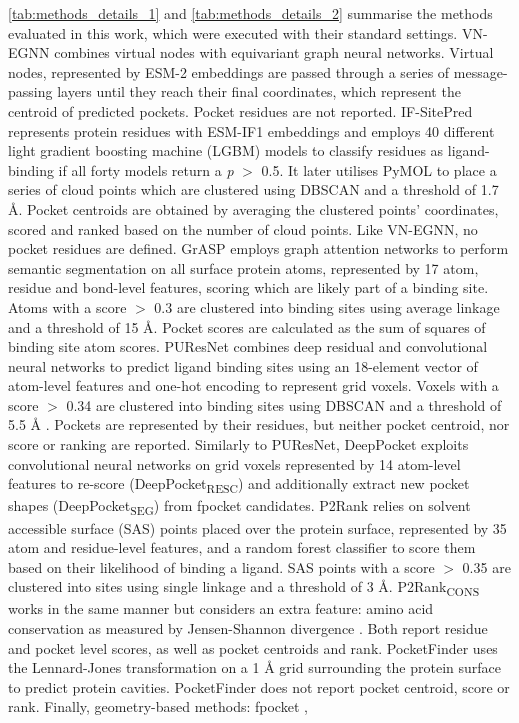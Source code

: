 \autoref{tab:methods_details_1} and \autoref{tab:methods_details_2} summarise the methods evaluated in this work, which were executed with their standard settings. VN-EGNN \cite{SESTAK_2024_VNEGNN} combines virtual nodes with equivariant graph neural networks. Virtual nodes, represented by ESM-2 embeddings \cite{RIVES_2021_EMBEDDINGS} are passed through a series of message-passing layers until they reach their final coordinates, which represent the centroid of predicted pockets. Pocket residues are not reported. IF-SitePred \cite{CARBERY_2024_IFSP} represents protein residues with ESM-IF1 embeddings \cite{HSU_2022_EMBEDDINGS} and employs 40 different light gradient boosting machine (LGBM) models \cite{KE_2017_LIGHTGBM} to classify residues as ligand-binding if all forty models return a \textit{p} $>$ 0.5. It later utilises PyMOL \cite{SCHRODINGER_2015_PYMOL} to place a series of cloud points which are clustered using DBSCAN \cite{ESTER_1996_DBSCAN}  and a threshold of 1.7 \AA{}. Pocket centroids are obtained by averaging the clustered points’ coordinates, scored and ranked based on the number of cloud points. Like VN-EGNN, no pocket residues are defined. GrASP \cite{SMITH_2024_GrASP} employs graph attention networks to perform semantic segmentation on all surface protein atoms, represented by 17 atom, residue and bond-level features, scoring which are likely part of a binding site. Atoms with a score $>$ 0.3 are clustered into binding sites using average linkage and a threshold of 15 \AA{}. Pocket scores are calculated as the sum of squares of binding site atom scores. PUResNet \cite{KANDEL_2021_PURESNET} combines deep residual and convolutional neural networks to predict ligand binding sites using an 18-element vector of atom-level features and one-hot encoding to represent grid voxels. Voxels with a score $>$ 0.34 are clustered into binding sites using DBSCAN and a threshold of 5.5 \AA{} \cite{KANDEL_2024_PURESNET}. Pockets are represented by their residues, but neither pocket centroid, nor score or ranking are reported. Similarly to PUResNet, DeepPocket \cite{AGGARWAL_2022_DEEPPOCKET} exploits convolutional neural networks on grid voxels represented by 14 atom-level features to re-score (DeepPocket\textsubscript{RESC}) and additionally extract new pocket shapes (DeepPocket\textsubscript{SEG}) from fpocket candidates. P2Rank \cite{KRIVAK_2018_P2RANK} relies on solvent accessible surface (SAS) points placed over the protein surface, represented by 35 atom and residue-level features, and a random forest classifier to score them based on their likelihood of binding a ligand. SAS points with a score $>$ 0.35 are clustered into sites using single linkage and a threshold of 3 \AA{}. P2Rank\textsubscript{CONS} \cite{JENDELE_2019_PRANKWEB} works in the same manner but considers an extra feature: amino acid conservation as measured by Jensen-Shannon divergence \cite{CAPRA_2007_JSD}. Both report residue and pocket level scores, as well as pocket centroids and rank. PocketFinder \cite{AN_2005_POCKETFINDER} uses the Lennard-Jones \cite{JONES_1924_POTENTIAL} transformation on a 1 \AA{} grid surrounding the protein surface to predict protein cavities. PocketFinder does not report pocket centroid, score or rank. Finally, geometry-based methods: fpocket \cite{GUILLOUX_2009_FPOCKET}, 